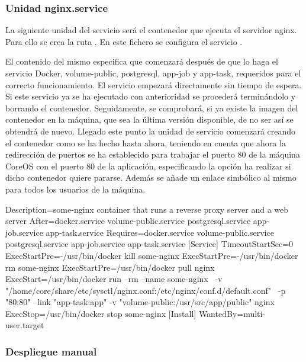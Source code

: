 \subsubsection{Unidad nginx.service}

La siguiente unidad del servicio será el contenedor que ejecuta el servidor nginx. Para ello se crea la ruta . En este fichero se configura el servicio .

El contenido del mismo especifica que comenzará después de que lo haga el servicio Docker, volume-public, postgresql, app-job y app-task, requeridos para el correcto funcionamiento. El servicio empezará directamente sin tiempo de espera. Si este servicio ya se ha ejecutado con anterioridad se procederá terminándolo y borrando el contenedor. Seguidamente, se comprobará, si ya existe la imagen del contenedor en la máquina, que sea la última versión disponible, de no ser así se obtendrá de nuevo. Llegado este punto la unidad de servicio comenzará creando el contenedor como se ha hecho hasta ahora, teniendo en cuenta que ahora la redirección de puertos se ha establecido para trabajar el puerto 80 de la máquina CoreOS con el puerto 80 de la aplicación, especificando la opción ha realizar si dicho contenedor quiere pararse. Además se añade un enlace simbólico al mismo para todos los usuarios de la máquina. 

\begin{codelisting}
\label{code:nginx.service}
\begin{code}
[Unit] 
  Description=some-nginx container that runs a reverse proxy server and a 
              web server
  After=docker.service volume-public.service postgresql.service app-job.service 
        app-task.service
  Requires=docker.service volume-public.service postgresql.service 
           app-job.service app-task.service
[Service] 
  TimeoutStartSec=0 
  ExecStartPre=-/usr/bin/docker kill some-nginx 
  ExecStartPre=-/usr/bin/docker rm some-nginx
  ExecStartPre=/usr/bin/docker pull nginx 
  ExecStart=/usr/bin/docker run --rm --name some-nginx \
  -v "/home/core/share/etc/sysctl/nginx.conf:/etc/nginx/conf.d/default.conf" \
  -p "80:80" --link "app-task:app" -v "volume-public:/usr/src/app/public" nginx 
  ExecStop=/usr/bin/docker stop some-nginx
[Install] 
  WantedBy=multi-user.target
\end{code}
\end{codelisting}

\subsubsection{Despliegue manual}

